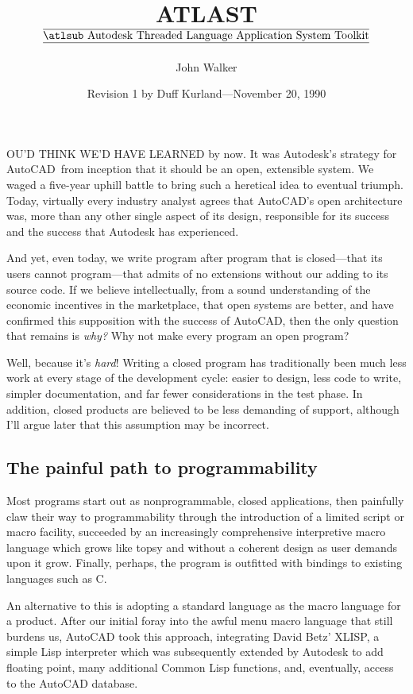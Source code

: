 \documentclass[twocolumn]{article}
\title{
ATLAST\\
\vspace{3pt}
$\overline{\makebox{\underline{\atlsub Autodesk Threaded Language Application
System Toolkit}}}$
}
\author{John Walker}
\date{Revision 1 by Duff Kurland---November 20, 1990}
\begin{document}
\maketitle

\newcommand{\atlast}{\underline{\underline{\sc Atlast}}}

OU'D THINK WE'D HAVE LEARNED by now.  It was Autodesk's
strategy for AutoCAD\rtm\ from inception that it should be an open,
extensible system.  We waged a five-year uphill battle to bring such a
heretical idea to eventual triumph.  Today, virtually every industry
analyst agrees that AutoCAD's open architecture was, more than any
other single aspect of its design, responsible for its success and the
success that Autodesk has experienced.

And yet, even today, we write program after program that is
closed---that its users cannot program---that admits of no extensions
without our adding to its source code.  If we believe intellectually,
from a sound understanding of the economic incentives in the
marketplace, that open systems are better, and have confirmed this
supposition with the success of AutoCAD, then the only question that
remains is {\em why?}  Why not make every program an open program?

Well, because it's {\em hard\/}!  Writing a closed program has
traditionally been much less work at every stage of the development
cycle: easier to design, less code to write, simpler documentation,
and far fewer considerations in the test phase.  In addition, closed
products are believed to be less demanding of support,
although I'll argue later that this assumption may be incorrect.

\subsection{The painful path to programmability}

Most programs start out as nonprogrammable, closed applications, then
painfully claw their way to programmability through the introduction
of a limited script or macro facility, succeeded by an increasingly
comprehensive interpretive macro language which grows like topsy and
without a coherent design as user demands upon it grow.  Finally,
perhaps, the program is outfitted with bindings to existing languages
such as C\@.

An alternative to this is adopting a standard language as the macro
language for a product.  After our initial foray into the awful menu
macro language that still burdens us, AutoCAD took this
approach, integrating David Betz' XLISP, a simple Lisp interpreter
which was subsequently extended by Autodesk to add floating point,
many additional Common Lisp functions, and, eventually, access to the
AutoCAD database.
\end{document}
